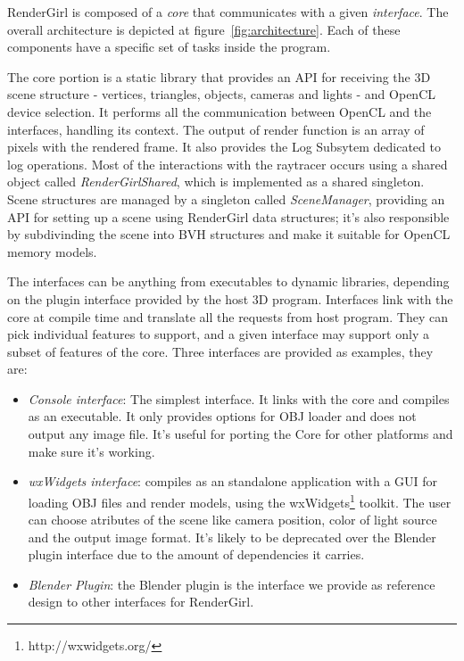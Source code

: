 \documentclass[a4paper]{sbgames}               %
\begin{document}
RenderGirl is composed of a \emph{core} that communicates with a given
\emph{interface}. The overall architecture is depicted at figure~\ref{fig:architecture}. Each of these components have a specific set
of tasks inside the program.

The core portion is a static library that provides an API for
receiving the 3D scene structure - vertices, triangles, objects,
cameras and lights - and OpenCL device selection. It performs all the
communication between OpenCL and the interfaces, handling its
context. The output of render function is an array of pixels with the
rendered frame. It also provides the Log Subsytem dedicated to log
operations. Most of the interactions with the raytracer occurs using a
shared object called \emph{RenderGirlShared}, which is implemented as
a shared singleton. Scene structures are managed by a singleton called
\emph{SceneManager}, providing an API for setting up a scene using
RenderGirl data structures; it's also responsible by subdivinding the
scene into BVH structures and make it suitable for OpenCL memory
models.


The interfaces can be anything from executables to dynamic libraries,
depending on the plugin interface provided by the host 3D
program. Interfaces link with the core at compile time and translate
all the requests from host program. They can pick individual features
to support, and a given interface may support only a subset of
features of the core. Three interfaces are provided as examples, they
are:

\begin{itemize}
\item \emph{Console interface}: The simplest interface. It links with
  the core and compiles as an executable. It only provides options for
  OBJ loader and does not output any image file. It's useful for
  porting the Core for other platforms and make sure it's working.
\item \emph{wxWidgets interface}: compiles as an standalone
  application with a GUI for loading OBJ files and render models,
  using the wxWidgets\footnote{http://wxwidgets.org/} toolkit. The
  user can choose atributes of the scene like camera position, color
  of light source and the output image format. It's likely to be
  deprecated over the Blender plugin interface due to the amount of
  dependencies it carries.
\item \emph{Blender Plugin}: the Blender plugin is the interface we
  provide as reference design to other interfaces for RenderGirl.
\end{itemize}
\end{document}
